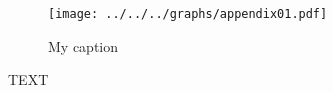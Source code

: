 \documentclass[essd, manuscript]{copernicus}
\begin{document}
\begin{figure}[t]
    \texttt{[image: ../../../graphs/appendix01.pdf]}
    \caption{My caption}
\end{figure}

\appendixtables   %








\begin{acknowledgements}
    TEXT
\end{acknowledgements}





\end{document}
